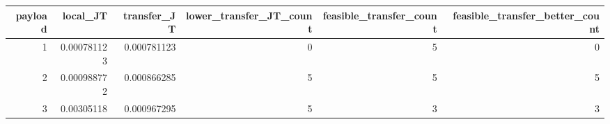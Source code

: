 \begin{tabular}{rrrrrr}
\toprule
payload & local\_JT & transfer\_JT & lower\_transfer\_JT\_count & feasible\_transfer\_count & feasible\_transfer\_better\_count \\
\midrule
1 & 0.000781123 & 0.000781123 & 0 & 5 & 0 \\
2 & 0.000988772 & 0.000866285 & 5 & 5 & 5 \\
3 & 0.00305118 & 0.000967295 & 5 & 3 & 3 \\
\bottomrule
\end{tabular}

